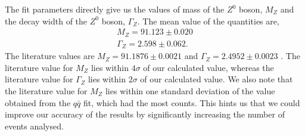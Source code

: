 The fit parameters directly give us the values of mass of the $Z^0$ boson, $M_Z$ and the decay width of the $Z^0$ boson, $\Gamma_Z$. The mean value of the quantities are,
\begin{equation}
\begin{split}
    M_Z = 91.123 \pm 0.020 \\
    \Gamma_Z = 2.598 \pm 0.062.
\end{split}
\end{equation}
The literature values are $M_Z = 91.1876 \pm 0.0021$ and $\Gamma_Z = 2.4952 \pm 0.0023$ \cite{pdg2}. The literature value for $M_Z$ lies within $4\sigma$ of our calculated value, whereas the literature value for $\Gamma_Z$ lies within $2\sigma$ of our calculated value. We also note that the literature value for $M_Z$ lies within one standard deviation of the value obtained from the $q\bar{q}$ fit, which had the most counts. This hints us that we could improve our accuracy of the results by significantly increasing the number of events analysed.


